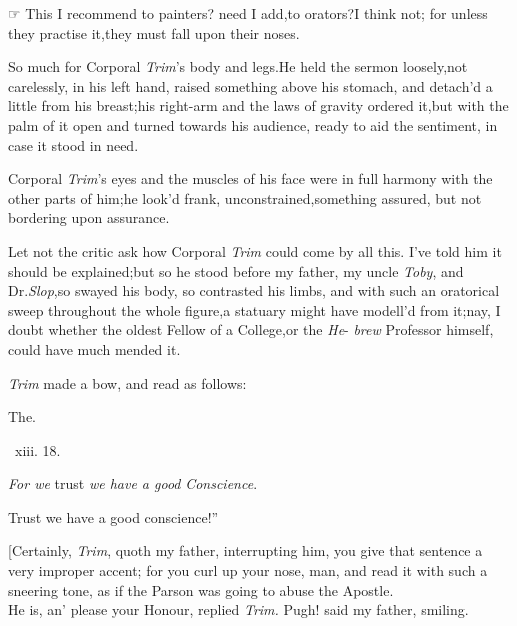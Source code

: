 \documentclass{article}
\begin{document}
☞ This I recommend to painters?\tsk\break
need I add,\tsk to orators?\tsk I think not;\break
for unless they practise it,\tsh they must\break
fall upon their noses.

So much for Corporal \textit{Trim}’s body and
legs.\tsk He held the sermon loosely,\tsk not carelessly, in
his left hand, raised something above his stomach, and detach’d a
little from his breast;\tsh his right-arm
and the laws of gravity ordered
it,\tsh but with the palm of it open and turned towards
his audience, ready to aid the sentiment, in case it stood in
need.

Corporal \textit{Trim}’s eyes and the muscles of his face
were in full harmony with the other parts of him;\tsk he look’d
frank,\tsk\break
unconstrained,\tsk something assured,\tsh\break
but not bordering upon assurance.

Let not the critic ask how Corporal \textit{Trim} could come by
all this. I’ve told him it should be explained;\tsk but so he
stood before my father, my uncle \textit{Toby}, and Dr.\@ \textit{Slop},\tsk so swayed his body, so contrasted his limbs, and
with such an oratorical sweep throughout the whole
figure,\tsh a statuary might have modell’d from
it;\tsh nay, I doubt whether the oldest Fellow of a
College,\tsk or the \textit{He}-
\textit{brew} Professor himself, could have
much mended it.

\textit{Trim} made a bow, and read as follows:

\bigskip
\centerline{The\quad {}.}
\bigskip
\centerline{\, xiii. 18.}
\tsh \textit{For we} trust \textit{we have a good}\break
\textit{Conscience}.\tsh

\tsh 
Trust we have a good conscience!”

[Certainly, \textit{Trim}, quoth my father, interrupting him, you
give that sentence a very improper accent; for you curl up your
nose, man, and read it with such a sneering tone, as if the Parson
was going to abuse the Apostle.\\
\newpage
He is, an’ please your Honour, replied \textit{Trim.} Pugh!
said my father, smiling.
\end{document}
